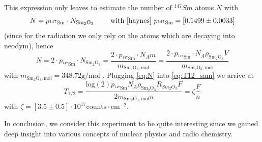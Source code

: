 This expression only leaves to estimate the number of $^{147}Sm$ atoms $N$ with
\begin{equation}
    N = p_{\mathrm{^{147}Sm}} \cdot N_{\mathrm{Sm_2O_3}} 
    \qquad \text{ with \cite{haynes} } p_{\mathrm{^{147}Sm}}= [0.1499\pm0.0033]
\end{equation}
(since for the radiation we only
rely on the atoms which are decaying into neodym), hence
\begin{equation}
    N = 2 \cdot p_{\mathrm{^{147}Sm}} \cdot N_{\mathrm{Sm_2O_3}} 
    = \frac{2 \cdot p_{\mathrm{^{147}Sm}} \cdot N_A m}{m_{\mathrm{Sm_2O_3, mol}}}
    = \frac{2 \cdot p_{\mathrm{^{147}Sm}} \cdot N_A \rho_{\mathrm{Sm_2O_3}} V}{m_{\mathrm{Sm_2O_3, mol}}}
    \label{eq:N}
\end{equation}
with $m_{\mathrm{Sm_2O_3, mol}} = 348.72 \mathrm{g/mol} $ \cite{haynes}. 
Plugging \eqref{eq:N} into \eqref{eq:T12_sam} we arrive at
\begin{equation}
T_{1/2} = \frac{\mathrm{log}(2)p_{\mathrm{^{147}Sm}} 
 N_A \rho_{\mathrm{Sm_2O_3}}R_{Sm_2O_3}F}{2m_{\mathrm{Sm_2O_3, mol}}n } = \zeta \frac{F}{n} 
\label{eq:T12_sam}
\end{equation}
with $\zeta=[3.5\pm0.5]\cdot10^{17} \mathrm{counts \cdot cm^{-2}}$.

In conclusion, we consider this experiment to be quite interesting since we gained deep 
insight into various concepts of nuclear physics and radio chemistry.
